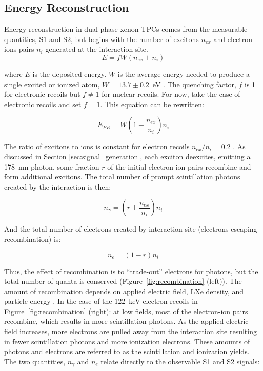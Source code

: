 \subsection{Energy Reconstruction}
\label{sec:energy_reconstruction}
Energy reconstruction in dual-phase xenon \ac{TPC}s comes from the measurable quantities, S1 and S2, but begins with the number of excitons $n_{ex}$  and electron-ions pairs $n_{i}$ generated at the interaction site. 
\begin{equation}
E = f W (n_{ex} + n_{i} )
\end{equation}

where $E$ is the deposited energy. $W$ is the average energy needed to produce a single excited or ionized atom, $W = 13.7 \pm 0.2$~eV \cite{Mock2014}. The quenching factor, $f$ is 1 for electronic recoils but $f \neq 1$ for nuclear recoils. For now, take the case of electronic recoils and set $f=1$. This equation can be rewritten:

\begin{equation}
E_{ER} = W (1 + \frac{n_{ex}}{n_{i}} ) n_{i}
\end{equation}

The ratio of excitons to ions is constant for electron recoils $n_{ex}/{n_{i}} = 0.2$ \cite{LUX:YieldsAndRecombination}. As discussed in Section \ref{sec:signal_generation}, each exciton deexcites, emitting a 178~nm photon, some fraction $r$ of the initial electron-ion pairs recombine and form additional excitons. The total number of prompt scintillation photons created by the interaction is then:

\begin{equation}
n_{\gamma} = (r + \frac{n_{ex}}{n_{i}} ) n_{i}
\end{equation}

And the total number of electrons created by interaction site (electrons escaping recombination) is:

\begin{equation}
n_{e} = (1 - r ) n_{i}
\end{equation}

Thus, the effect of recombination is to ``trade-out'' electrons for photons, but the total number of quanta is conserved (Figure~\ref{fig:recombination} (left)). The amount of recombination depends on applied electric field, \ac{LXe} density, and particle energy \cite{LUX:YieldsAndRecombination}. In the case of the 122~keV electron recoils in Figure~\ref{fig:recombination} (right): at low fields, most of the electron-ion pairs recombine, which results in more scintillation photons. As the applied electric field increases, more electrons are pulled away from the interaction site resulting in fewer scintillation photons and more ionization electrons. These amounts of photons and electrons are referred to as the scintillation and ionization yields. The two quantities, $n_{\gamma}$  and $n_{e}$ relate directly to the observable S1 and S2 signals:


